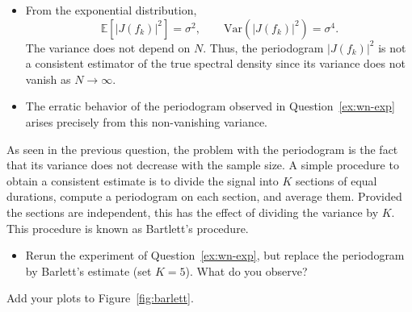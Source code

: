 \documentclass[11pt]{article}
\begin{document}
\begin{solution}
\begin{itemize}
\item From the exponential distribution,
\[
\mathbb{E}[|J(f_k)|^2] = \sigma^2, 
\qquad
\mathrm{Var}(|J(f_k)|^2) = \sigma^4.
\]
The variance does not depend on \(N\). Thus, the periodogram \( |J(f_k)|^2 \) is not a consistent estimator of the true spectral density since its variance does not vanish as \(N \to \infty\).

\item The erratic behavior of the periodogram observed in Question~\ref{ex:wn-exp} arises precisely from this non-vanishing variance.
\end{itemize}
\end{solution}


\begin{exercise}\label{q:barlett}
    As seen in the previous question, the problem with the periodogram is the fact that its variance does not decrease with the sample size.
    A simple procedure to obtain a consistent estimate is to divide the signal into $K$ sections of equal durations, compute a periodogram on each section, and average them.
    Provided the sections are independent, this has the effect of dividing the variance by $K$. 
    This procedure is known as Bartlett's procedure.
    \begin{itemize}
        \item Rerun the experiment of Question~\ref{ex:wn-exp}, but replace the periodogram by Barlett's estimate (set $K=5$). What do you observe?
    \end{itemize}
    Add your plots to Figure~\ref{fig:barlett}.
\end{exercise}

\end{document}
